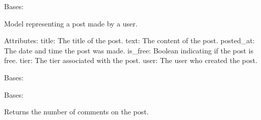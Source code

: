 \documentclass[letterpaper,10pt,english]{sphinxmanual}
\begin{document}

\begin{fulllineitems}
\label{\detokenize{modules/models:creator.models.Post}}
\pysigstartsignatures
{}
\pysigstopsignatures
\sphinxAtStartPar
Bases: 

\sphinxAtStartPar
Model representing a post made by a user.

\sphinxAtStartPar
Attributes:
\sphinxhyphen{} title: The title of the post.
\sphinxhyphen{} text: The content of the post.
\sphinxhyphen{} posted\_at: The date and time the post was made.
\sphinxhyphen{} is\_free: Boolean indicating if the post is free.
\sphinxhyphen{} tier: The tier associated with the post.
\sphinxhyphen{} user: The user who created the post.

\begin{fulllineitems}
\label{\detokenize{modules/models:creator.models.Post.DoesNotExist}}
\pysigstartsignatures
{}
\pysigstopsignatures
\sphinxAtStartPar
Bases: 

\end{fulllineitems}


\begin{fulllineitems}
\label{\detokenize{modules/models:creator.models.Post.MultipleObjectsReturned}}
\pysigstartsignatures
{}
\pysigstopsignatures
\sphinxAtStartPar
Bases: 

\end{fulllineitems}


\begin{fulllineitems}
\label{\detokenize{modules/models:creator.models.Post.comments_count}}
\pysigstartsignatures
{}
\pysigstopsignatures
\sphinxAtStartPar
Returns the number of comments on the post.


\end{fulllineitems}
\end{fulllineitems}
\end{document}
